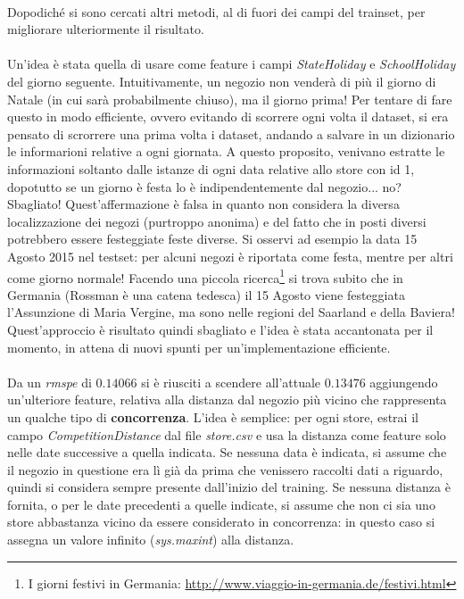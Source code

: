 \\
Dopodiché si sono cercati altri metodi, al di fuori dei campi del trainset, per migliorare ulteriormente il risultato.\\
\\
Un'idea è stata quella di usare come feature i campi \textit{StateHoliday} e \textit{SchoolHoliday} del giorno seguente. Intuitivamente, un negozio non venderà di più il giorno di Natale (in cui sarà probabilmente chiuso), ma il giorno prima! Per tentare di fare questo in modo efficiente, ovvero evitando di scorrere ogni volta il dataset, si era pensato di scrorrere una prima volta i dataset, andando a salvare in un dizionario le informarioni relative a ogni giornata. A questo proposito, venivano estratte le informazioni soltanto dalle istanze di ogni data relative allo store con id 1, dopotutto se un giorno è festa lo è indipendentemente dal negozio... no? Sbagliato! Quest'affermazione è falsa in quanto non considera la diversa localizzazione dei negozi (purtroppo anonima) e del fatto che in posti diversi potrebbero essere festeggiate feste diverse. Si osservi ad esempio la data 15 Agosto 2015 nel testset: per alcuni negozi è riportata come festa, mentre per altri come giorno normale! Facendo una piccola ricerca\footnote{I giorni festivi in Germania: \url{http://www.viaggio-in-germania.de/festivi.html}} si trova subito che in Germania (Rossman è una catena tedesca) il 15 Agosto viene festeggiata l'Assunzione di Maria Vergine, ma sono nelle regioni del Saarland e della Baviera! Quest'approccio è risultato quindi sbagliato e l'idea è stata accantonata per il momento, in attena di nuovi spunti per un'implementazione efficiente.\\
\\
Da un \textit{rmspe} di $0.14066$ si è riusciti a scendere all'attuale $0.13476$ aggiungendo un'ulteriore feature, relativa alla distanza dal negozio più vicino che rappresenta un qualche tipo di \textbf{concorrenza}. L'idea è semplice: per ogni store, estrai il campo \textit{CompetitionDistance} dal file \textit{store.csv} e usa la  distanza come feature solo nelle date successive a quella indicata. Se nessuna data è indicata, si assume che il negozio in questione era lì già da prima che venissero raccolti dati a riguardo, quindi si considera sempre presente dall'inizio del training. Se nessuna distanza è fornita, o per le date precedenti a quelle indicate, si assume che non ci sia uno store abbastanza vicino da essere considerato in concorrenza: in questo caso si assegna un valore infinito (\textit{sys.maxint}) alla distanza.\\
